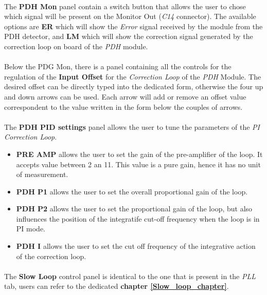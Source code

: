 \paragraph{} The \textbf{PDH Mon} panel contain a switch button that allows the user to chose which signal will be present on the Monitor Out (\textit{C14} connector). The available options are \textbf{ER} which will show the \textit{Error} signal received by the module from the PDH detector, and \textbf{LM} which will show the correction signal generated by the correction loop on board of the \textit{PDH} module.

\paragraph{} Below the PDG Mon, there is a panel containing all the controls for the regulation of the \textbf{Input Offset} for the \textit{Correction Loop} of the \textit{PDH} Module. The desired offset can be directly typed into the dedicated form, otherwise the four up and down arrows can be used. Each arrow will add or remove an offset value correspondent to the value written in the form below the couples of arrows.

\paragraph{} The \textbf{PDH PID settings} panel allows the user to tune the parameters of the \textit{PI Correction Loop}. 
\begin{itemize}
    \item \textbf{PRE AMP} allows the user to set the gain of the pre-amplifier of the loop. It accepts value between 2 an 11. This value is a pure gain, hence it has no unit of measurement.
    \item \textbf{PDH P1} allows the user to set the overall proportional gain of the loop.
    \item \textbf{PDH P2} allows the user to set the proportional gain of the loop, but also influences the position of the integratife cut-off frequency when the loop is in PI mode.
    \item \textbf{PDH I} allows the user to set the cut off frequency of the integrative action of the correction loop.
\end{itemize}

\paragraph{} The \textbf{Slow Loop} control panel is identical to the one that is present in the \textit{PLL} tab, users can refer to the dedicated \textbf{chapter \ref{Slow_loop_chapter}}.

